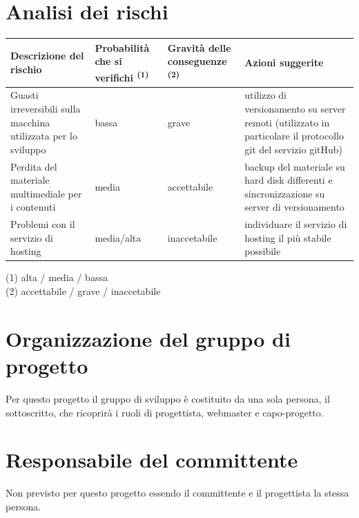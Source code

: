 \documentclass[a4paper,12pt,hidelinks]{report}
\begin{document}
\section{Analisi dei rischi}
  \begin{center}
    \begin{tabular}{||m{4cm}|m{2.3cm}|m{2.3cm}|m{4cm}||}
      \hline
	\textbf{Descrizione del rischio} & \textbf{Probabilità che si verifichi} \textsuperscript{(1)} & \textbf{Gravità delle conseguenze} \textsuperscript{(2)} & \textbf{Azioni suggerite} \\
      \hline
	Guasti irreversibili sulla macchina utilizzata per lo sviluppo & bassa  & grave & utilizzo di versionamento su server remoti (utilizzato in particolare 
	il protocollo git del servizio gitHub)\\
      \hline
	Perdita del materiale multimediale per i contenuti & media & accettabile & backup del materiale su hard disk differenti e sincronizzazione 
	su server di versionamento\\
      \hline  
	Problemi con il servizio di hosting & media/alta & inaccetabile & individuare il servizio di hosting il più stabile possibile\\
      \hline
    \end{tabular}
    (1) alta / media / bassa \\
    (2) accettabile / grave / inaccetabile
  \end{center}

\section{Organizzazione del gruppo di progetto}
Per questo progetto il gruppo di sviluppo è costituito da una sola persona, il sottoscritto, che ricoprirà i ruoli di progettista, webmaster e capo-progetto.
\section{Responsabile del committente}
Non previsto per questo progetto essendo il committente e il progettista la stessa persona. 
\end{document}
